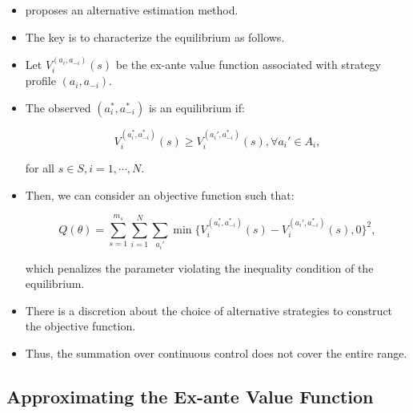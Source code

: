 \documentclass[]{book}
\providecommand{\tightlist}{%
  \setlength{\itemsep}{0pt}\setlength{\parskip}{0pt}}
\begin{document}
\begin{itemize}
\tightlist
\item
  \citet{bajariEstimatingDynamicModels2007} proposes an alternative
  estimation method.
\item
  The key is to characterize the equilibrium as follows.
\item
  Let \(V_i^{(a_i, a_{-i})}(s)\) be the ex-ante value function
  associated with strategy profile \((a_i, a_{-i})\).
\item
  The observed \((a_i^*, a_{-i}^*)\) is an equilibrium if:

  \begin{equation}
  V_i^{(a_i^*, a_{-i}^*)}(s) \ge V_i^{(a_i', a_{-i}^*)}(s), \forall a_i' \in A_i,
  \end{equation}

  for all \(s \in S, i = 1, \cdots, N\).
\item
  Then, we can consider an objective function such that:

  \begin{equation}
  Q(\theta) = \sum_{s = 1}^{m_s} \sum_{i = 1}^N \sum_{a_i'} \min\{V_i^{(a_i^*, a_{-i}^*)}(s) - V_i^{(a_i', a_{-i}^*)}(s), 0\}^2,
  \end{equation}

  which penalizes the parameter violating the inequality condition of
  the equilibrium.
\item
  There is a discretion about the choice of alternative strategies to
  construct the objective function.
\item
  Thus, the summation over continuous control does not cover the entire
  range.
\end{itemize}

\subsection{Approximating the Ex-ante Value
Function}\label{approximating-the-ex-ante-value-function}
\end{document}
